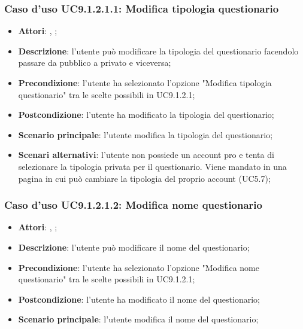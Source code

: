 					\subsubsection{Caso d'uso UC9.1.2.1.1: Modifica tipologia questionario}
					\label{UC9.1.2.1.1}
					\begin{itemize}
						\item \textbf{Attori}: \uau, \uaupro;
						\item \textbf{Descrizione}: l'utente può modificare la tipologia del questionario facendolo passare da pubblico a privato e viceversa; 
						\item \textbf{Precondizione}: l'utente ha selezionato l'opzione "Modifica tipologia questionario" tra le scelte possibili in UC9.1.2.1;
						\item \textbf{Postcondizione}: l'utente ha modificato la tipologia del questionario;
						\item \textbf{Scenario principale}: l'utente modifica la tipologia del questionario;
						\item \textbf{Scenari alternativi}: l'utente non possiede un account pro e tenta di selezionare la tipologia privata per il questionario. Viene mandato in una pagina in cui può cambiare la tipologia del proprio account (UC5.7); 
					\end{itemize}
											
					\subsubsection{Caso d'uso UC9.1.2.1.2: Modifica nome questionario}
					\label{UC9.1.2.1.2}
					\begin{itemize}
						\item \textbf{Attori}: \uau, \uaupro;
						\item \textbf{Descrizione}: l'utente può modificare il nome del questionario; 
						\item \textbf{Precondizione}: l'utente ha selezionato l'opzione "Modifica nome questionario" tra le scelte possibili in UC9.1.2.1;
						\item \textbf{Postcondizione}: l'utente ha modificato il nome del questionario; 
						\item \textbf{Scenario principale}: l'utente modifica il nome del questionario;
					\end{itemize}
					
